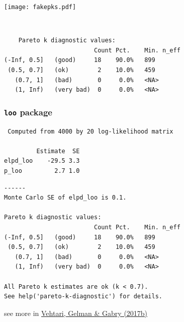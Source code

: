 \documentclass[english,t]{beamer}
\begin{document}
\begin{frame}[fragile]

  \texttt{[image: fakepks.pdf]}

\end{frame}

\begin{frame}[fragile]

  \\
  {\scriptsize
\begin{lstlisting}
    Pareto k diagnostic values:
                         Count Pct.    Min. n_eff
(-Inf, 0.5]   (good)     18    90.0%   899       
 (0.5, 0.7]   (ok)        2    10.0%   459       
   (0.7, 1]   (bad)       0     0.0%   <NA>      
   (1, Inf)   (very bad)  0     0.0%   <NA>      
\end{lstlisting}
}

\end{frame}

\begin{frame}[fragile]
  \frametitle{{\tt loo} package}

  {\scriptsize
    {\color{gray}
\begin{lstlisting}
 Computed from 4000 by 20 log-likelihood matrix

         Estimate  SE
elpd_loo    -29.5 3.3
p_loo         2.7 1.0
\end{lstlisting}
      }
\begin{lstlisting}
------
Monte Carlo SE of elpd_loo is 0.1.

Pareto k diagnostic values:
                         Count Pct.    Min. n_eff
(-Inf, 0.5]   (good)     18    90.0%   899       
 (0.5, 0.7]   (ok)        2    10.0%   459       
   (0.7, 1]   (bad)       0     0.0%   <NA>      
   (1, Inf)   (very bad)  0     0.0%   <NA>      

All Pareto k estimates are ok (k < 0.7).
See help('pareto-k-diagnostic') for details.
\end{lstlisting}
    }

    {\vspace{2\baselineskip}\small see more in \href{http://link.springer.com/article/10.1007/s11222-016-9696-4}{Vehtari, Gelman \& Gabry (2017b)}}

\end{frame}

\end{document}
